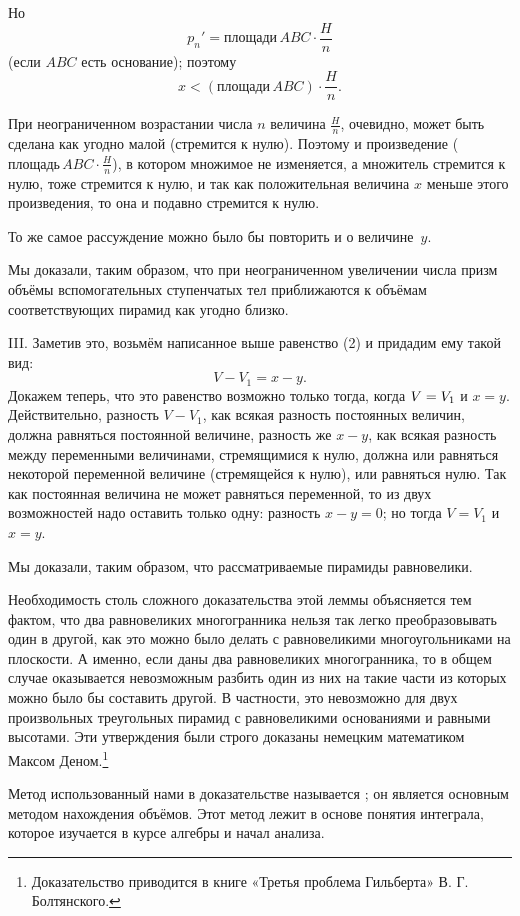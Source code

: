 {Но 
\[p_n'=\text{площади}\, ABC\cdot \frac Hn\]
(если $ABC$ есть основание); поэтому
\[x<(\text{площади}\, ABC)\cdot \frac Hn.\]

При неограниченном возрастании числа $n$ величина $\frac Hn$, очевидно, может быть сделана как угодно малой (стремится к нулю).
Поэтому и произведение ($\text{площадь}\, ABC\cdot \frac Hn$), в котором множимое не изменяется, а множитель стремится к нулю, тоже стремится к нулю, и так как положительная величина $x$ меньше этого произведения, то она и подавно стремится к нулю.

То же самое рассуждение можно было бы повторить и о величине~$y$.

Мы доказали, таким образом, что при неограниченном увеличении числа призм объёмы вспомогательных ступенчатых тел приближаются к объёмам соответствующих пирамид как угодно близко.

III.
Заметив это, возьмём написанное выше равенство (2) и придадим ему такой вид: 
\[V - V_1 = x - y.\]
Докажем теперь, что это равенство возможно только тогда, когда $V\z=V_1$ и $x=y$.
Действительно, разность $V-V_1$, как всякая разность постоянных величин, должна равняться постоянной величине, разность же $x-y$, как всякая разность между переменными величинами, стремящимися к нулю, должна или равняться некоторой переменной величине (стремящейся к нулю), или равняться нулю.
Так как постоянная величина не может равняться переменной, то из двух возможностей надо оставить только одну: разность $x-y=0$;
но тогда $V=V_1$ и $x=y$.

Мы доказали, таким образом, что рассматриваемые пирамиды равновелики.


\medskip

Необходимость столь сложного доказательства этой леммы объясняется тем фактом, что два равновеликих многогранника нельзя так легко преобразовывать один в другой, как это можно было делать с равновеликими многоугольниками на плоскости.
А именно, если даны два равновеликих многогранника, то в общем случае оказывается невозможным разбить один из них на такие части из которых можно было бы составить другой.
В частности, это невозможно для двух произвольных треугольных пирамид с равновеликими основаниями и равными высотами.
Эти утверждения были строго доказаны немецким математиком Максом Деном.\footnote{Доказательство приводится в книге «Третья проблема Гильберта» В. Г. Болтянского.}

Метод использованный нами в доказательстве называется ; он является основным методом нахождения объёмов.
Этот метод лежит в основе понятия интеграла, которое изучается в курсе алгебры и начал анализа.

}
